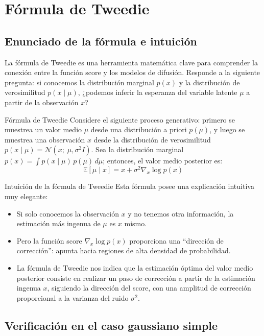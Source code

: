 \documentclass[a4paper]{article}
\begin{document}
\section{Fórmula de Tweedie}

\subsection{Enunciado de la fórmula e intuición}

La fórmula de Tweedie es una herramienta matemática clave para comprender la conexión entre la función score y los modelos de difusión. Responde a la siguiente pregunta: si conocemos la distribución marginal $p(x)$ y la distribución de verosimilitud $p(x \mid \mu)$, ¿podemos inferir la esperanza del variable latente $\mu$ a partir de la observación $x$?

\begin{importantbox}{Fórmula de Tweedie}
Considere el siguiente proceso generativo: primero se muestrea un valor medio $\mu$ desde una distribución a priori $p(\mu)$, y luego se muestrea una observación $x$ desde la distribución de verosimilitud $p(x \mid \mu) = \mathcal{N}(x;\; \mu, \sigma^2 I)$. Sea la distribución marginal $p(x) = \int p(x \mid \mu)\, p(\mu)\, d\mu$; entonces, el valor medio posterior es:
$$\mathbb{E}[\mu \mid x] = x + \sigma^2 \nabla_x \log p(x)$$
\end{importantbox}

\begin{knowledgebox}{Intuición de la fórmula de Tweedie}
Esta fórmula posee una explicación intuitiva muy elegante:
\begin{itemize}
    \item Si solo conocemos la observación $x$ y no tenemos otra información, la estimación más ingenua de $\mu$ es $x$ mismo.
    \item Pero la función score $\nabla_x \log p(x)$ proporciona una ``dirección de corrección'': apunta hacia regiones de alta densidad de probabilidad.
    \item La fórmula de Tweedie nos indica que la estimación óptima del valor medio posterior consiste en realizar un paso de corrección a partir de la estimación ingenua $x$, siguiendo la dirección del score, con una amplitud de corrección proporcional a la varianza del ruido $\sigma^2$.
\end{itemize}
\end{knowledgebox}

\subsection{Verificación en el caso gaussiano simple}
\end{document}
